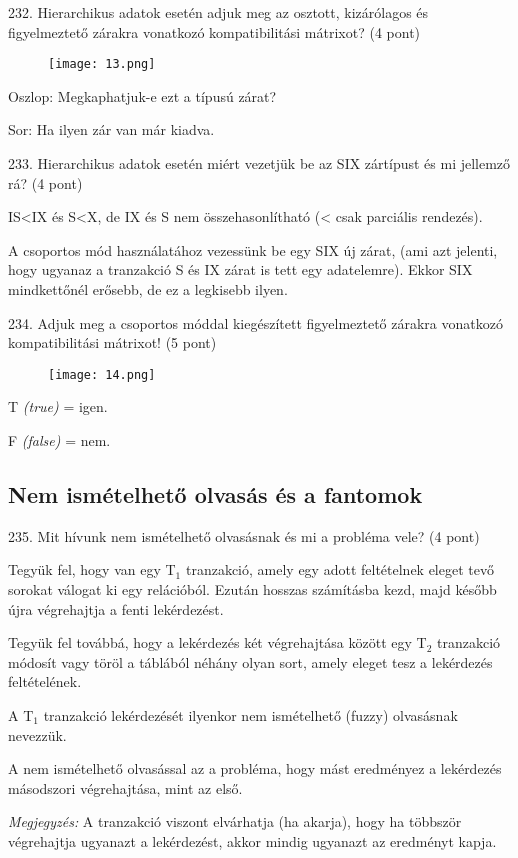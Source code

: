 \documentclass[a4paper,11.5pt, table]{article}
\begin{document}
232. Hierarchikus adatok esetén adjuk meg az osztott, kizárólagos és figyelmeztető zárakra vonatkozó kompatibilitási mátrixot? (4 pont)
	\begin{compactitem}
		\begin{figure}[h]
			\centering
			\texttt{[image: 13.png]}
		\end{figure}
		\item Oszlop: Megkaphatjuk-e ezt a típusú zárat?
		\item Sor: Ha ilyen zár van már kiadva.
	\end{compactitem}
		
233. Hierarchikus adatok esetén miért vezetjük be az SIX zártípust és mi jellemző rá? (4 pont)
	\begin{compactitem}
		\item IS<IX és S<X, de IX és S nem összehasonlítható (< csak parciális rendezés).
		\item A csoportos mód használatához vezessünk be egy SIX új zárat, (ami azt jelenti, hogy ugyanaz a tranzakció S és IX zárat is tett egy adatelemre). Ekkor SIX mindkettőnél erősebb, de ez a legkisebb ilyen.
	\end{compactitem}		
 
234. Adjuk meg a csoportos móddal kiegészített figyelmeztető zárakra vonatkozó kompatibilitási mátrixot! (5 pont)
	\begin{compactitem}
		\begin{figure}[h]
			\centering
			\texttt{[image: 14.png]}
		\end{figure}
		\item T \textit{(true)} = igen.
		\item F \textit{(false)} = nem.
	\end{compactitem}

\subsection{Nem ismételhető olvasás és a fantomok}

235. Mit hívunk nem ismételhető olvasásnak és mi a probléma vele? (4 pont)
	\begin{compactitem}
		\item Tegyük fel, hogy van egy T$ _{1} $ tranzakció, amely egy adott feltételnek eleget tevő sorokat válogat ki egy relációból. Ezután hosszas számításba kezd, majd később újra végrehajtja a fenti lekérdezést. 
		\item Tegyük fel továbbá, hogy a lekérdezés két végrehajtása között egy T$ _{2} $ tranzakció módosít vagy töröl a táblából néhány olyan sort, amely eleget tesz a lekérdezés feltételének. 
		\item A T$ _{1} $ tranzakció lekérdezését ilyenkor nem ismételhető (fuzzy) olvasásnak nevezzük. 
		\item A nem ismételhető olvasással az a probléma, hogy mást eredményez a lekérdezés másodszori végrehajtása, mint az első. 
		\item\textit{ Megjegyzés:} A tranzakció viszont elvárhatja (ha akarja), hogy ha többször végrehajtja ugyanazt a lekérdezést, akkor mindig ugyanazt az eredményt kapja.
	\end{compactitem}
\end{document}
